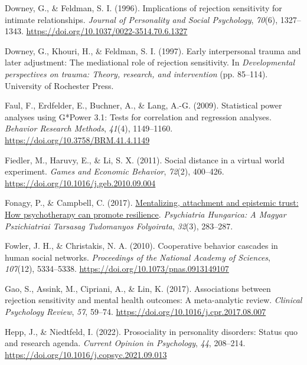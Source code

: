 \documentclass[
]{article}
\newlength{\cslhangindent}
\newenvironment{CSLReferences}[2] %
 {\begin{list}{}{%
  \setlength{\itemindent}{0pt}
  \setlength{\leftmargin}{0pt}
  \setlength{\parsep}{0pt}
  \ifodd #1
   \setlength{\leftmargin}{\cslhangindent}
   \setlength{\itemindent}{-1\cslhangindent}
  \fi
  \setlength{\itemsep}{#2\baselineskip}}}
 {\end{list}}
\begin{document}
\begin{CSLReferences}{1}{0}
Downey, G., \& Feldman, S. I. (1996). Implications of rejection sensitivity for intimate relationships. \emph{Journal of Personality and Social Psychology}, \emph{70}(6), 1327--1343. \url{https://doi.org/10.1037/0022-3514.70.6.1327}

Downey, G., Khouri, H., \& Feldman, S. I. (1997). Early interpersonal trauma and later adjustment: {The} mediational role of rejection sensitivity. In \emph{Developmental perspectives on trauma: {Theory}, research, and intervention} (pp. 85--114). University of Rochester Press.

Faul, F., Erdfelder, E., Buchner, A., \& Lang, A.-G. (2009). Statistical power analyses using {G}*{Power} 3.1: {Tests} for correlation and regression analyses. \emph{Behavior Research Methods}, \emph{41}(4), 1149--1160. \url{https://doi.org/10.3758/BRM.41.4.1149}

Fiedler, M., Haruvy, E., \& Li, S. X. (2011). Social distance in a virtual world experiment. \emph{Games and Economic Behavior}, \emph{72}(2), 400--426. \url{https://doi.org/10.1016/j.geb.2010.09.004}

Fonagy, P., \& Campbell, C. (2017). \href{https://www.ncbi.nlm.nih.gov/pubmed/29135441}{Mentalizing, attachment and epistemic trust: How psychotherapy can promote resilience}. \emph{Psychiatria Hungarica: A Magyar Pszichiatriai Tarsasag Tudomanyos Folyoirata}, \emph{32}(3), 283--287.

Fowler, J. H., \& Christakis, N. A. (2010). Cooperative behavior cascades in human social networks. \emph{Proceedings of the National Academy of Sciences}, \emph{107}(12), 5334--5338. \url{https://doi.org/10.1073/pnas.0913149107}

Gao, S., Assink, M., Cipriani, A., \& Lin, K. (2017). Associations between rejection sensitivity and mental health outcomes: {A} meta-analytic review. \emph{Clinical Psychology Review}, \emph{57}, 59--74. \url{https://doi.org/10.1016/j.cpr.2017.08.007}

Hepp, J., \& Niedtfeld, I. (2022). Prosociality in personality disorders: {Status} quo and research agenda. \emph{Current Opinion in Psychology}, \emph{44}, 208--214. \url{https://doi.org/10.1016/j.copsyc.2021.09.013}


\end{CSLReferences}
\end{document}

